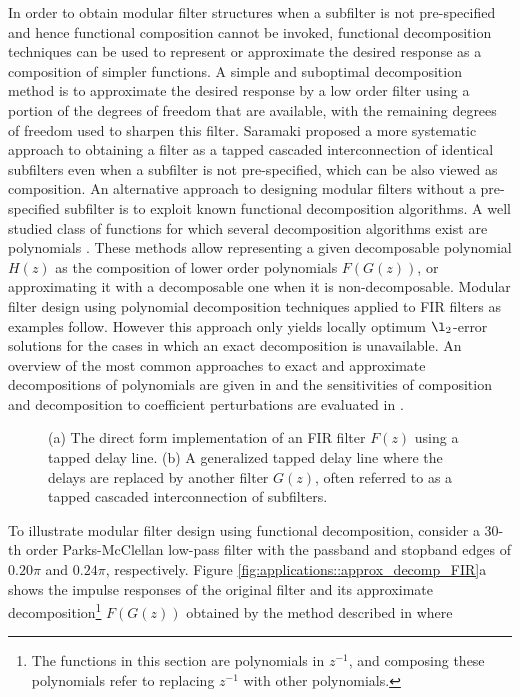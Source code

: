 \documentclass[journal] {IEEEtran}
\begin{document}
In order to obtain modular filter structures when a subfilter is not pre-specified and hence functional composition cannot be invoked, functional decomposition techniques can be used to represent or approximate the desired response as a composition of simpler functions. A simple and suboptimal decomposition method is to approximate the desired response by a low order filter using a portion of the degrees of freedom that are available, with the remaining degrees of freedom used to sharpen this filter. Saramaki \cite{Saramaki} proposed a more systematic approach to obtaining a filter as a tapped cascaded interconnection of identical subfilters even when a subfilter is not pre-specified, which can be also viewed as composition. An alternative approach to designing modular filters without a pre-specified subfilter is to exploit known functional decomposition algorithms. A well studied class of functions for which several decomposition algorithms exist are polynomials \cite{Barton, Alagar,Kozen1989,Aubry2012, Corless, Giesbrecht, Botting2005}. These methods allow representing a given decomposable polynomial $H(z)$ as the composition of lower order polynomials $F(G(z))$, or approximating it with a decomposable one when it is non-decomposable. Modular filter design using polynomial decomposition techniques applied to FIR filters as examples follow. However this approach only yields locally optimum $\l_2$-error solutions for the cases in which an exact decomposition is unavailable. An overview of the most common approaches to exact and approximate decompositions of polynomials are given in \cite{Demirtas2013} and the sensitivities of composition and decomposition to coefficient perturbations are evaluated in \cite{Demirtas2012}.

\begin{figure}
\centering
{}
\quad
{}
\caption{(a) The direct form implementation of an FIR filter $F(z)$ using a tapped delay line. (b) A generalized tapped delay line where the delays are replaced by another filter $G(z)$, often referred to as a tapped cascaded interconnection of subfilters.}\label{fig:applications::ComposedFIR}
\end{figure}


To illustrate  modular filter design using functional decomposition, consider a $30$-th order Parks-McClellan low-pass filter with the passband and stopband edges of $0.20\pi$ and $0.24\pi$, respectively. Figure \ref{fig:applications::approx_decomp_FIR}a shows the impulse responses of the original filter and its approximate decomposition\footnote{The functions in this section are polynomials in $z^{-1}$, and composing these polynomials refer to replacing $z^{-1}$ with other polynomials.} $F(G(z))$ obtained by the method described in \cite{Corless} where 
\end{document}
